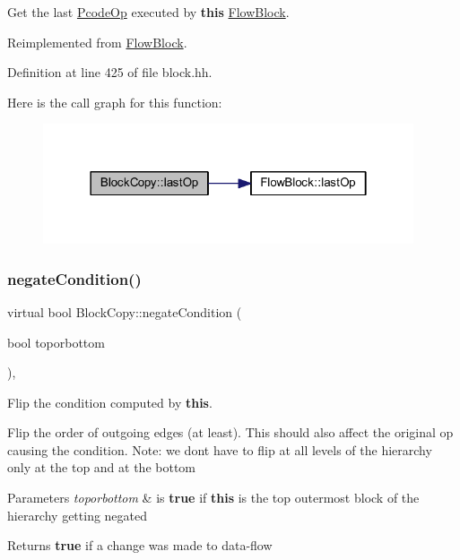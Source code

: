 Get the last \mbox{\hyperlink{class_pcode_op}{Pcode\+Op}} executed by {\bfseries{this}} \mbox{\hyperlink{class_flow_block}{Flow\+Block}}. 



Reimplemented from \mbox{\hyperlink{class_flow_block_a5db2a7d4baa2070ebf3151b13fd16d09}{Flow\+Block}}.



Definition at line 425 of file block.\+hh.

Here is the call graph for this function\+:
\nopagebreak
\begin{figure}[H]
\begin{center}
\leavevmode
\includegraphics[width=310pt]{class_block_copy_ab07a0819d0e6527dd08240f09400c7d6_cgraph}
\end{center}
\end{figure}
\mbox{\label{class_block_copy_ad31f116ca37dd1ba235f0642365cf4f4}} 
\subsubsection{\texorpdfstring{negateCondition()}{negateCondition()}}
{\footnotesize\ttfamily virtual bool Block\+Copy\+::negate\+Condition (\begin{DoxyParamCaption}\item[{bool}]{toporbottom }\end{DoxyParamCaption})\hspace{0.3cm}{\ttfamily [inline]}, {\ttfamily [virtual]}}



Flip the condition computed by {\bfseries{this}}. 

Flip the order of outgoing edges (at least). This should also affect the original op causing the condition. Note\+: we don\textquotesingle{}t have to flip at all levels of the hierarchy only at the top and at the bottom 
\begin{DoxyParams}{Parameters}
{\em toporbottom} & is {\bfseries{true}} if {\bfseries{this}} is the top outermost block of the hierarchy getting negated \\
\hline
\end{DoxyParams}
\begin{DoxyReturn}{Returns}
{\bfseries{true}} if a change was made to data-\/flow 
\end{DoxyReturn}


